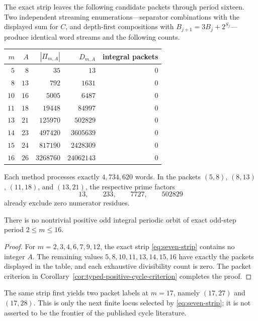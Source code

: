 The exact strip leaves the following candidate packets through period
sixteen.  Two independent streaming enumerations---separator combinations
with the displayed sum for $C$, and depth-first compositions with
$B_{j+1}=3B_j+2^{S_j}$---produce identical word streams and the following
counts.
\begin{center}
\begin{tabular}{r r r r r}
\toprule
$m$ & $A$ & $|\Pi_{m,A}|$ & $D_{m,A}$ & integral packets\\
\midrule
$5$  & $8$  & $35$      & $13$       & $0$\\
$8$  & $13$ & $792$     & $1631$     & $0$\\
$10$ & $16$ & $5005$    & $6487$     & $0$\\
$11$ & $18$ & $19448$   & $84997$    & $0$\\
$13$ & $21$ & $125970$  & $502829$   & $0$\\
$14$ & $23$ & $497420$  & $3605639$  & $0$\\
$15$ & $24$ & $817190$  & $2428309$  & $0$\\
$16$ & $26$ & $3268760$ & $24062143$ & $0$\\
\bottomrule
\end{tabular}
\end{center}
Each method processes exactly $4{,}734{,}620$ words.  In the packets
$(5,8)$, $(8,13)$, $(11,18)$, and $(13,21)$, the respective prime factors
\[
 13,\qquad233,\qquad7727,\qquad502829
\]
already exclude zero numerator residues.

\begin{theorem}
\label{thm:certified-period-sixteen-exclusion}
There is no nontrivial positive odd integral periodic orbit of exact odd-step
period $2\le m\le16$.
\end{theorem}

\begin{proof}
For $m=2,3,4,6,7,9,12$, the exact strip
\eqref{eq:seven-strip} contains no integer $A$.  The remaining values
$5,8,10,11,13,14,15,16$ have exactly the packets displayed in the table, and
each exhaustive divisibility count is zero.  The packet criterion in
Corollary~\ref{cor:typed-positive-cycle-criterion} completes the proof.
\end{proof}

The same strip first yields two packet labels at $m=17$, namely $(17,27)$
and $(17,28)$.  This is only the next finite locus selected by
\eqref{eq:seven-strip}; it is not asserted to be the frontier of the
published cycle literature.

